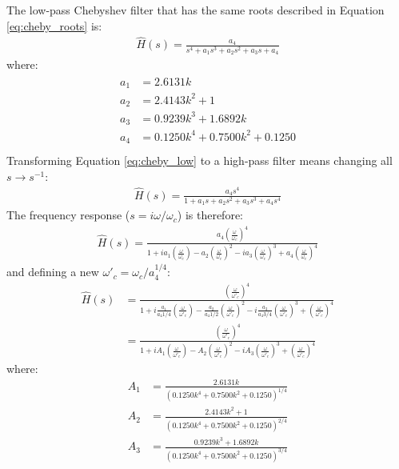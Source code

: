\documentclass[10pt,letterpaper]{book}
\begin{document}
The low-pass Chebyshev filter that has the same roots described in Equation \ref{eq:cheby_roots} is:
\begin{align}
\hat{H}(s)=\frac{a_4}{s^4+a_1s^3+a_2s^2+a_3s+a_4}\label{eq:cheby_low}
\end{align}
where:
\begin{align}
\begin{split}
a_1&=2.6131k\\
a_2&=2.4143k^2+1\\
a_3&=0.9239k^3+1.6892k\\
a_4&=0.1250k^4+0.7500k^2+0.1250\\
\end{split}
\end{align}
Transforming Equation \ref{eq:cheby_low} to a high-pass filter means changing all $s\rightarrow s^{-1}$:
\begin{align}
\hat{H}(s)=\frac{a_4s^4}{1+a_1s+a_2s^2+a_3s^3+a_4s^4}
\end{align}
The frequency response ($s=i\omega/\omega_c$) is therefore:
\begin{align}
\hat{H}(s)=\frac{a_4\left(\frac{\omega}{\omega_c}\right)^4}{1+i a_1\left(\frac{\omega}{\omega_c}\right)-a_2\left(\frac{\omega}{\omega_c}\right)^2-ia_3\left(\frac{\omega}{\omega_c}\right)^3+a_4\left(\frac{\omega}{\omega_c}\right)^4}
\end{align}
and defining a new $\omega'_c=\omega_c /a_4^{1/4}$:
\begin{align}
\hat{H}(s)&=\frac{\left(\frac{\omega}{\omega'_c}\right)^4}{1+i\frac{a_1}{a_4{1/4}}\left(\frac{\omega}{\omega'_c}\right)-\frac{a_2}{a_4{1/2}}\left(\frac{\omega}{\omega'_c}\right)^2-i\frac{a_3}{a_4{3/4}}\left(\frac{\omega}{\omega'_c}\right)^3+\left(\frac{\omega}{\omega'_c}\right)^4}\\
&=\frac{\left(\frac{\omega}{\omega'_c}\right)^4}{1+iA_1 \left(\frac{\omega}{\omega'_c}\right)-A_2\left(\frac{\omega}{\omega'_c}\right)^2-iA_3\left(\frac{\omega}{\omega'_c}\right)^3+\left(\frac{\omega}{\omega'_c}\right)^4}
\end{align}
where:
\begin{align}
A_1&=\frac{2.6131k}{(0.1250k^4+0.7500k^2+0.1250)^{1/4}}\\
A_2&=\frac{2.4143k^2+1}{(0.1250k^4+0.7500k^2+0.1250)^{2/4}}\\
A_3&=\frac{0.9239k^3+1.6892k}{(0.1250k^4+0.7500k^2+0.1250)^{3/4}}
\end{align}
\end{document}
